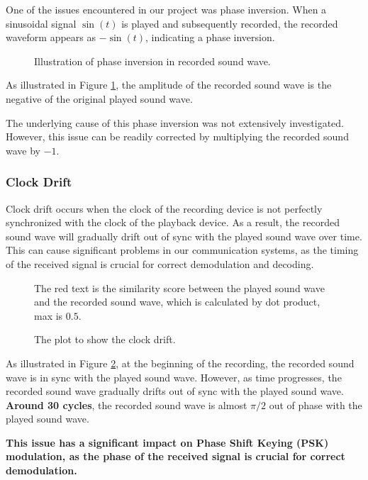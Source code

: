 \documentclass{article}
\begin{document}
One of the issues encountered in our project was phase inversion.
When a sinusoidal signal \(\sin(t)\) is played and subsequently recorded, the recorded waveform appears as \(-\sin(t)\), indicating a phase inversion.

\begin{figure}[H]
    \noindent\makebox[\textwidth]{}
    \caption{Illustration of phase inversion in recorded sound wave.}
    \label{fig:flip}
\end{figure}

As illustrated in Figure \ref{fig:flip}, the amplitude of the recorded sound wave is the negative of the original played sound wave.

The underlying cause of this phase inversion was not extensively investigated.
However, this issue can be readily corrected by multiplying the recorded sound wave by \(-1\).

\subsubsection{Clock Drift}

Clock drift occurs when the clock of the recording device is not perfectly synchronized with the clock of the playback device.
As a result, the recorded sound wave will gradually drift out of sync with the played sound wave over time.
This can cause significant problems in our communication systems, as the timing of the received signal is crucial for correct demodulation and decoding.

\begin{figure}[H]
    \noindent\makebox[\textwidth]{}
    \caption{The plot to show the clock drift.}
    \smallskip
    \small
    The red text is the similarity score between the played sound wave and the recorded sound wave, which is calculated by dot product, max is \(0.5\).
    \label{fig:drift}
\end{figure}

As illustrated in Figure \ref{fig:drift}, at the beginning of the recording, the recorded sound wave is in sync with the played sound wave. However, as time progresses, the recorded sound wave gradually drifts out of sync with the played sound wave. \textbf{Around 30 cycles}, the recorded sound wave is almost \(\pi/2\) out of phase with the played sound wave.

\textbf{This issue has a significant impact on Phase Shift Keying (PSK) modulation, as the phase of the received signal is crucial for correct demodulation.}
\end{document}
